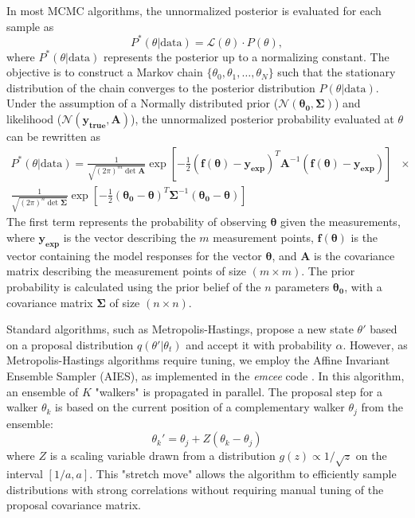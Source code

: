 \documentclass[preprint,review,12pt]{elsarticle}
\begin{document}
In most MCMC algorithms, the unnormalized posterior is evaluated for each sample as
\begin{equation}
    P^*(\theta | \text{data}) = \mathcal{L}(\theta) \cdot P(\theta),
\end{equation}
where $P^*(\theta | \text{data})$ represents the posterior up to a normalizing constant. The objective is to construct a Markov chain $\{\theta_0, \theta_1, \dots, \theta_N\}$ such that the stationary distribution of the chain converges to the posterior distribution $P(\theta|\text{data})$. Under the assumption of a Normally distributed prior ($\mathcal{N}(\mathbf{\theta_0}, \mathbf{\Sigma})$) and likelihood ($\mathcal{N} (\mathbf{y_\text{true}}, \mathbf{A})$), the unnormalized posterior probability evaluated at $\theta$ can be rewritten as
\begin{equation}
    \begin{split}
        P^*(\theta | \text{data}) = \frac{1}{\sqrt{(2\pi)^m\det\mathbf{A}}}\exp\left[-\frac{1}{2}(\mathbf{f(\theta)}-\mathbf{y_{\text{exp}}})^T\mathbf{A}^{-1}(\mathbf{f(\theta)}-\mathbf{y_{\text{exp}}})\right]& \times \\ \frac{1}{\sqrt{(2\pi)^n\det\mathbf{\Sigma}}}\exp\left[-\frac{1}{2}( \mathbf{\theta_{0}}-\mathbf{\theta})^T\mathbf{\Sigma}^{-1}(\mathbf{\theta_{0}}-\mathbf{\theta})\right]&
    \end{split}
\end{equation}
The first term represents the probability of observing $\mathbf{\theta}$ given the measurements, where $\mathbf{y_\text{exp}}$ is the vector describing the $m$ measurement points, $\mathbf{f(\theta)}$ is the vector containing the model responses for the vector $\mathbf{\theta}$, and $\mathbf{A}$ is the covariance matrix describing the measurement points of size $(m \times m)$. The prior probability is calculated using the prior belief of the $n$ parameters $\mathbf{\theta_0}$, with a covariance matrix $\mathbf{\Sigma}$ of size $(n\times n)$. 

Standard algorithms, such as Metropolis-Hastings, propose a new state $\theta'$ based on a proposal distribution $q(\theta'|\theta_t)$ and accept it with probability $\alpha$. However, as Metropolis-Hastings algorithms require tuning, we employ the Affine Invariant Ensemble Sampler (AIES), as implemented in the \textit{emcee} code \cite{emcee}. In this algorithm, an ensemble of $K$ "walkers" is propagated in parallel. The proposal step for a walker $\theta_k$ is based on the current position of a complementary walker $\theta_j$ from the ensemble:
\begin{equation}
    \theta_k' = \theta_j + Z (\theta_k - \theta_j)
\end{equation}
where $Z$ is a scaling variable drawn from a distribution $g(z) \propto 1/\sqrt{z}$ on the interval $[1/a, a]$. This "stretch move" allows the algorithm to efficiently sample distributions with strong correlations without requiring manual tuning of the proposal covariance matrix.
\end{document}

